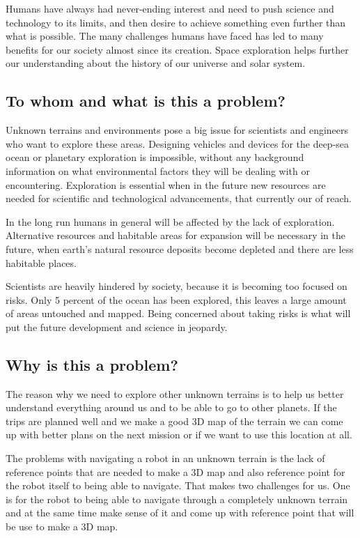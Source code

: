 Humans have always had never-ending interest and need to push science and technology to its limits, and then desire to achieve something even further than what is possible. The many challenges humans have faced has led to many benefits for our society almost since its creation. Space exploration helps further our understanding about the history of our universe and solar system.\cite{whyweexplo}

\subsection{To whom and what is this a problem?}
Unknown terrains and environments pose a big issue for scientists and engineers who want to explore these areas. Designing vehicles and devices for the deep-sea ocean or planetary exploration is impossible, without any background information on what environmental factors they will be dealing with or encountering. Exploration is essential when in the future new resources are needed for scientific and technological advancements, that currently our of reach.

In the long run humans in general will be affected by the lack of exploration. Alternative resources and habitable areas for expansion will be necessary in the future, when earth's natural resource deposits become depleted and there are less habitable places. 

Scientists are heavily hindered by society, because it is becoming too focused on risks. Only 5 percent of the ocean has been explored, this leaves a large amount of areas untouched and mapped. Being concerned about taking risks is what will put the future development and science in jeopardy.\cite{risksandexplo} 

\subsection{Why is this a problem?}
The reason why we need to explore other unknown terrains is to help us better understand everything around us and to be able to go to other planets. 
If the trips are planned well and we make a good 3D map of the terrain we can come up with better plans on the next mission or if we want to use this location at all. 

The problems with navigating a robot in an unknown terrain is the lack of reference points that are needed to make a 3D map and also reference point for the robot itself to being able to navigate. That makes two challenges for us. One is for the robot to being able to navigate through a completely unknown terrain and at the same time make sense of it and come up with reference point that will be use to make a 3D map.

